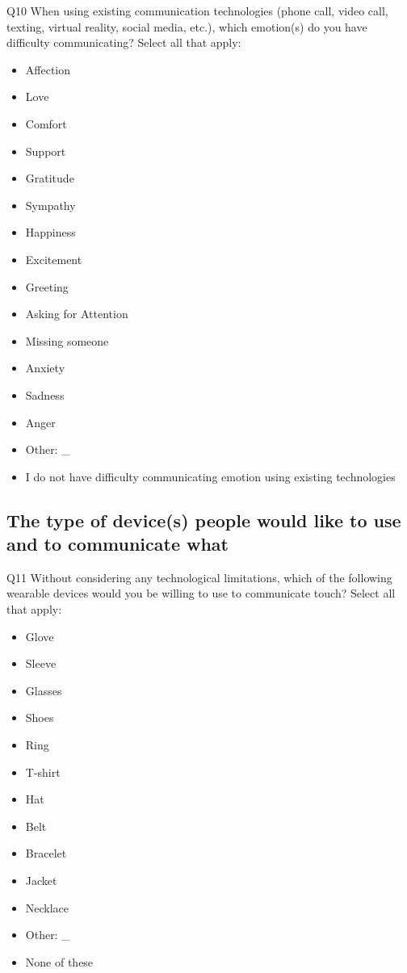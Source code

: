 \documentclass[acmsmall]{acmart}
\begin{document}
Q10 When using existing communication technologies (phone call, video call, texting, virtual reality, social media, etc.), which emotion(s) do you have difficulty communicating? 
Select all that apply:
\begin{itemize}
\item Affection  
\item Love  
\item Comfort  
\item Support  
\item Gratitude  
\item Sympathy  
\item Happiness  
\item Excitement 
\item Greeting 
\item Asking for Attention  
\item Missing someone  
\item Anxiety  
\item Sadness  
\item Anger  
\item Other:  \_
\item I do not have difficulty communicating emotion using existing technologies  
\end{itemize}

\subsection{The type of device(s) people would like to use and to communicate what}

Q11 Without considering any technological limitations, which of the following wearable devices would you be willing to use to communicate touch? 
Select all that apply:
\begin{itemize}
\item Glove  
\item Sleeve  
\item Glasses 
\item Shoes   
\item Ring  
\item T-shirt  
\item Hat 
\item Belt  
\item Bracelet 
\item Jacket  
\item Necklace 
\item Other:  \_
\item None of these 
\end{itemize}
\end{document}
